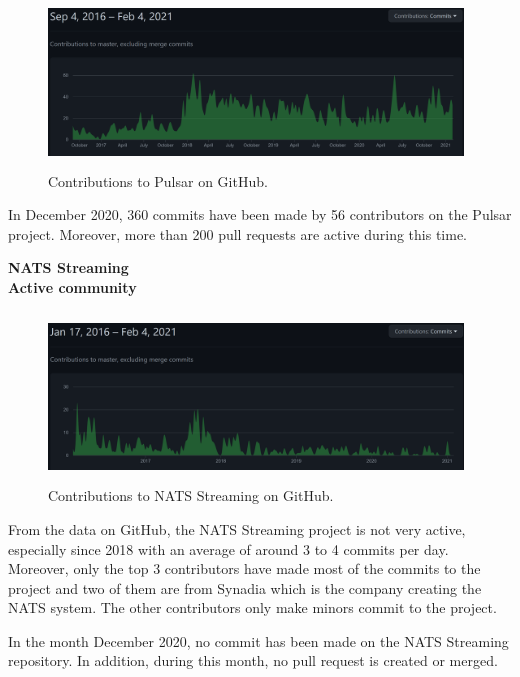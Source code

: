 \begin{figure}[h]
	\centering
	\includegraphics[width=11cm,height=4.5cm]{images/community-pulsar.png}
	\caption{Contributions to Pulsar on GitHub.}
	\label{fig:communitypulsar}
\end{figure}

In December 2020, 360 commits have been made by 56 contributors on the Pulsar project. Moreover, more than 200 pull requests are active during this time. 

\large \textbf{NATS Streaming}\\
\normalsize
\textbf{Active community}\\
\begin{figure}[h]
	\centering
	\includegraphics[width=11cm,height=4.5cm]{images/community-nats.png}
	\caption{Contributions to NATS Streaming on GitHub.}
	\label{fig:communitynats}
\end{figure}

From the data on GitHub, the NATS Streaming project is not very active, especially since 2018 with an average of around 3 to 4 commits per day. Moreover, only the top 3 contributors have made most of the commits to the project and two of them are from Synadia which is the company creating the NATS system. The other contributors only make minors commit to the project. 

In the month December 2020, no commit has been made on the NATS Streaming repository. In addition, during this month, no pull request is created or merged. 

